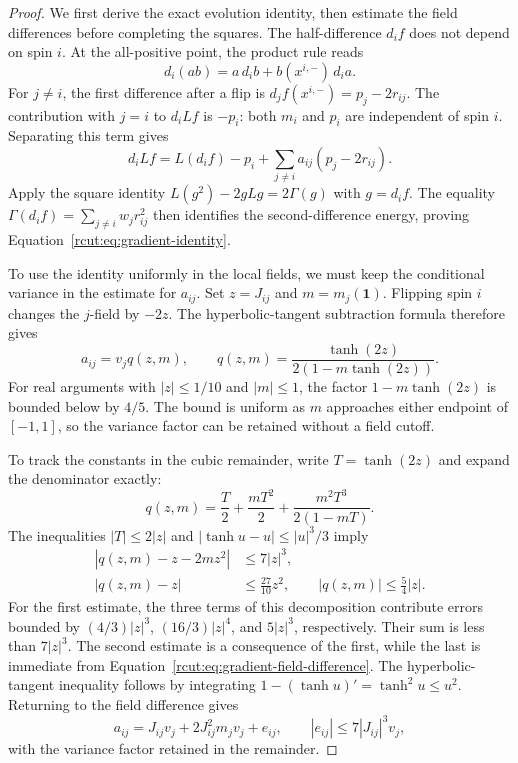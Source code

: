 \begin{proof}
We first derive the exact evolution identity, then estimate the field
differences before completing the squares.  The half-difference $d_if$
does not depend on spin $i$.  At the all-positive point, the product
rule reads
\[
 d_i(ab)=a\,d_ib+b(x^{i,-})\,d_ia.
\]
For $j\ne i$, the first difference after a flip is
$d_jf(x^{i,-})=p_j-2r_{ij}$.  The contribution with $j=i$ to
$d_iL f$ is $-p_i$: both $m_i$ and $p_i$ are independent of spin $i$.
Separating this term gives
\[
 d_iL f=L(d_if)-p_i
                   +\sum_{j\ne i}a_{ij}(p_j-2r_{ij}).
\]
Apply the square identity $L(g^2)-2gL g=2\Gamma(g)$ with $g=d_if$.
The equality $\Gamma(d_if)=\sum_{j\ne i}w_jr_{ij}^2$ then identifies
the second-difference energy, proving
Equation~\eqref{rcut:eq:gradient-identity}.

To use the identity uniformly in the local fields, we must keep the
conditional variance in the estimate for $a_{ij}$.  Set $z=J_{ij}$
and $m=m_j(\mathbf 1)$.  Flipping spin $i$ changes the $j$-field by
$-2z$.  The hyperbolic-tangent subtraction formula therefore gives
\begin{equation}
 a_{ij}=v_j q(z,m),\qquad
 q(z,m)=\frac{\tanh(2z)}{2(1-m\tanh(2z))}.
\label{rcut:eq:gradient-field-difference}
\end{equation}
For real arguments with $|z|\le1/10$ and $|m|\le1$, the factor
$1-m\tanh(2z)$ is bounded below by $4/5$.
The bound is uniform as $m$ approaches either endpoint of $[-1,1]$,
so the variance factor can be retained without a field cutoff.

To track the constants in the cubic remainder, write $T=\tanh(2z)$
and expand the denominator exactly:
\[
 q(z,m)=\frac T2+\frac{mT^2}{2}
                   +\frac{m^2T^3}{2(1-mT)}.
\]
The inequalities $|T|\le2|z|$ and
$|\tanh u-u|\le |u|^3/3$ imply
\begin{equation}
 \begin{split}
 |q(z,m)-z-2mz^2|&\le7|z|^3,\\
 |q(z,m)-z|&\le\frac{27}{10}z^2,
 \qquad |q(z,m)|\le\frac54|z|.
 \end{split}
\label{rcut:eq:gradient-q-bounds}
\end{equation}
For the first estimate, the three terms of this decomposition contribute
errors bounded by $(4/3)|z|^3$, $(16/3)|z|^4$, and $5|z|^3$,
respectively.  Their sum is less than $7|z|^3$.
The second estimate is a consequence of the first, while the last is
immediate from Equation~\eqref{rcut:eq:gradient-field-difference}.
The hyperbolic-tangent inequality follows by integrating
$1-(\tanh u)'=\tanh^2u\le u^2$.
Returning to the field difference gives
\[
 a_{ij}=J_{ij}v_j+2J_{ij}^2m_jv_j+e_{ij},
 \qquad |e_{ij}|\le7|J_{ij}|^3v_j,
\]
with the variance factor retained in the remainder.


\end{proof}
